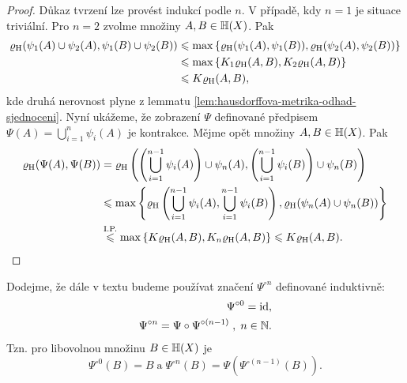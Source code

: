 \begin{proof}
    Důkaz tvrzení lze provést indukcí podle $n$. V případě, kdy $n=1$ je situace triviální. Pro $n=2$ zvolme množiny $A,B\in\mathbb{H}(X)$. Pak
    \begin{align*}
        \varrho_\textup{H}(\psi_1(A)\cup\psi_2(A),\psi_1(B)\cup\psi_2(B))&\leqslant\max\left\{\varrho_\textup{H}(\psi_1(A),\psi_1(B)),\varrho_\textup{H}(\psi_2(A),\psi_2(B))\right\}\\
        &\leqslant\max\left\{K_1\varrho_\textup{H}(A,B),K_2\varrho_\textup{H}(A,B)\right\}\\
        &\leqslant K\varrho_\textup{H}(A,B),
    \end{align*}
    kde druhá nerovnost plyne z lemmatu \ref{lem:hausdorffova-metrika-odhad-sjednoceni}. Nyní ukážeme, že zobrazení $\Psi
    $ definované předpisem $\Psi(A)=\bigcup_{i=1}^n\psi_i(A)$ je kontrakce. Mějme opět množiny $A,B\in\mathbb{H}(X)$. Pak
    \begin{align*}
        \varrho_\textup{H}(\Psi(A),\Psi(B))&=\varrho_\textup{H}\left(\left(\bigcup_{i=1}^{n-1}\psi_i(A)\right)\cup\psi_n(A),\left(\bigcup_{i=1}^{n-1}\psi_i(B)\right)\cup\psi_n(B)\right)\\
        &\leqslant\max\left\{\varrho_\textup{H}\left(\bigcup_{i=1}^{n-1}\psi_i(A),\bigcup_{i=1}^{n-1}\psi_i(B)\right),\varrho_\textup{H}(\psi_n(A)\cup\psi_n(B))\right\}\\
        &\stackrel{\text{I.P.}}{\leqslant}\max\left\{K\varrho_\textup{H}(A,B),K_n\varrho_\textup{H}(A,B)\right\}\leqslant K\varrho_\textup{H}(A,B).
    \end{align*}
\end{proof}
\begin{remark}
    Dodejme, že dále v textu budeme používat značení $\Psi^{\circ n}$ definované induktivně:
    \begin{align*}
        \Psi^{\circ 0}=\operatorname{id},\\
        \Psi^{\circ n}=\Psi\circ\Psi^{\circ(n-1)}\;,\;n\in\mathbb{N}.
    \end{align*}
    Tzn. pro libovolnou množinu $B\in\mathbb{H}(X)$ je
    \[\Psi^{\circ 0}(B)=B\;\text{a}\;\Psi^{\circ n}(B)=\Psi(\Psi^{\circ(n-1)}(B)).\]
\end{remark}

